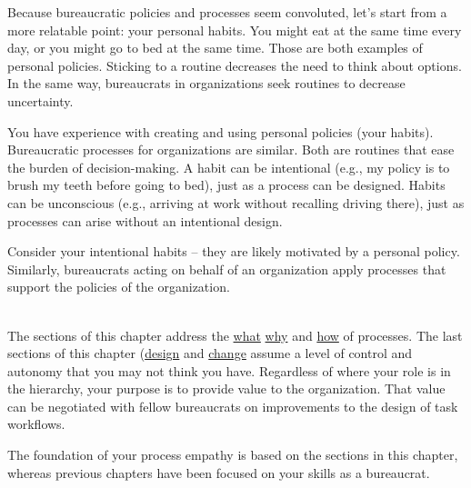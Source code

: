 
Because bureaucratic policies and processes seem convoluted, let's start from a more relatable point: your personal habits.
You might eat at the same time every day, or you might go to bed at the same time. Those are both examples of personal policies. Sticking to a routine decreases the need to think about options. In the same way, bureaucrats in organizations seek routines to decrease uncertainty. 

You have experience with creating and using personal policies (your habits).  Bureaucratic processes for organizations are similar.
Both are routines that ease the burden of decision-making. A habit can be intentional (e.g., my policy is to brush my teeth before going to bed), just as a process can be designed. Habits can be unconscious (e.g., arriving at work without recalling driving there), just as processes can arise without an intentional design. 

Consider your intentional habits -- they are likely motivated by a personal policy. Similarly, bureaucrats acting on behalf of an organization apply processes that support the policies of the organization.

\ \\

The sections of this chapter address 
the \hyperref[sec:definition-of-process]{what}\iftoggle{haspagenumbers}{(page~\pageref{sec:definition-of-process}), }{,}
\hyperref[sec:why-processes-exist]{why}\iftoggle{haspagenumbers}{(page~\pageref{sec:why-processes-exist}), }{,}
and 
\hyperref[sec:process-chaos]{how} \iftoggle{haspagenumbers}{(page~\pageref{sec:process-chaos}) }{}
of processes. 
The last sections of this chapter 
(\hyperref[sec:design-of-processes]{design} \iftoggle{haspagenumbers}{ on page~\pageref{sec:design-of-processes} }{}
and 
\hyperref[sec:change-a-process]{change}\iftoggle{haspagenumbers}{ on page~\pageref{sec:change-a-process})}{)} 
assume a level of control and autonomy that you may not think  you have. Regardless of where your role is in the hierarchy, your purpose is to provide value to the organization. That value can be negotiated with fellow bureaucrats on improvements to the design of task workflows. 

The foundation of your \gls{process empathy} is based on the sections in this chapter, whereas previous chapters have been focused on your skills as a bureaucrat. 